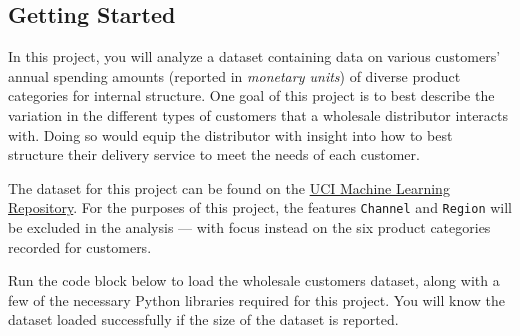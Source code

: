 \documentclass[11pt]{article}
\begin{document}
    \subsection{Getting Started}\label{getting-started}

In this project, you will analyze a dataset containing data on various
customers' annual spending amounts (reported in \emph{monetary units})
of diverse product categories for internal structure. One goal of this
project is to best describe the variation in the different types of
customers that a wholesale distributor interacts with. Doing so would
equip the distributor with insight into how to best structure their
delivery service to meet the needs of each customer.

The dataset for this project can be found on the
\href{https://archive.ics.uci.edu/ml/datasets/Wholesale+customers}{UCI
Machine Learning Repository}. For the purposes of this project, the
features \texttt{\textquotesingle{}Channel\textquotesingle{}} and
\texttt{\textquotesingle{}Region\textquotesingle{}} will be excluded in
the analysis --- with focus instead on the six product categories
recorded for customers.

Run the code block below to load the wholesale customers dataset, along
with a few of the necessary Python libraries required for this project.
You will know the dataset loaded successfully if the size of the dataset
is reported.
\end{document}
